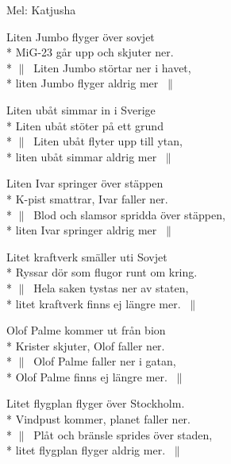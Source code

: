 \begin{SongText}
    \begin{SongInfo}
        Mel: Katjusha
    \end{SongInfo}
    \begin{SongVerse}
        Liten Jumbo flyger över sovjet\\*%
        MiG-23 går upp och skjuter ner.\\*%
        $\|\:$ Liten Jumbo störtar ner i havet,\\*%
        liten Jumbo flyger aldrig mer $\:\|$
    \end{SongVerse}
    \begin{SongVerse}
        Liten ubåt simmar in i Sverige\\*%
        Liten ubåt stöter på ett grund\\*%
        $\|\:$ Liten ubåt flyter upp till ytan,\\*%
        liten ubåt simmar aldrig mer $\:\|$
    \end{SongVerse}
    \begin{SongVerse}
        Liten Ivar springer över stäppen\\*%
        K-pist smattrar, Ivar faller ner.\\*%
        $\|\:$ Blod och slamsor spridda över stäppen,\\*%
        liten Ivar springer aldrig mer $\:\|$
    \end{SongVerse}
    \begin{SongVerse}
        Litet kraftverk smäller uti Sovjet\\*%
        Ryssar dör som flugor runt om kring.\\*%
        $\|\:$ Hela saken tystas ner av staten,\\*%
        litet kraftverk finns ej längre mer. $\:\|$
    \end{SongVerse}
    \begin{SongVerse}
        Olof Palme kommer ut från bion\\*%
        Krister skjuter, Olof faller ner.\\*%
        $\|\:$ Olof Palme faller ner i gatan,\\*%
        Olof Palme finns ej längre mer. $\:\|$
    \end{SongVerse}
    \begin{SongVerse}
        Litet flygplan flyger över Stockholm.\\*%
        Vindpust kommer, planet faller ner.\\*%
        $\|\:$ Plåt och bränsle sprides över staden,\\*%
        litet flygplan flyger aldrig mer. $\:\|$
    \end{SongVerse}
\end{SongText}
